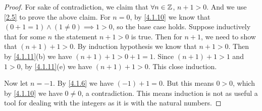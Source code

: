 \begin{proof}
  For sake of contradiction, we claim that \(\forall n \in \mathbb{Z}\), \(n + 1 > 0\).
  And we use \cref{2.5} to prove the above claim.
  For \(n = 0\), by \cref{4.1.10} we know that \((0 + 1 = 1) \land (1 \neq 0) \implies 1 > 0\), so the base case holds.
  Suppose inductively that for some \(n\) the statement \(n + 1 > 0\) is true.
  Then for \(n + 1\), we need to show that \((n + 1) + 1 > 0\).
  By induction hypothesis we know that \(n + 1 > 0\).
  Then by \cref{4.1.11}(b) we have \((n + 1) + 1 > 0 + 1 = 1\).
  Since \((n + 1) + 1 > 1\) and \(1 > 0\), by \cref{4.1.11}(e) we have \((n + 1) + 1 > 0\).
  This close induction.

  Now let \(n = -1\).
  By \cref{4.1.6} we have \((-1) + 1 = 0\).
  But this means \(0 > 0\), which by \cref{4.1.10} we have \(0 \neq 0\), a contradiction.
  This means induction is not as useful a tool for dealing with the integers as it is with the natural numbers.
\end{proof}